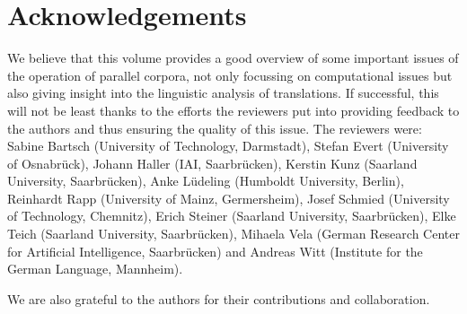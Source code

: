 \documentclass[output=paper]{LSP/langsci}
\begin{document}
\section{Acknowledgements} 

We believe that this volume provides a good overview of some important issues of the operation of parallel corpora, not only focussing on computational issues but also giving insight into the linguistic analysis of translations. If successful, this will not be least thanks to the efforts the reviewers put into providing feedback to the authors and thus ensuring the quality of this issue. The reviewers were: Sabine Bartsch (University of Technology, Darmstadt), Stefan Evert (University of Osnabrück), Johann Haller (IAI, Saarbrücken), Kerstin Kunz (Saarland University, Saarbrücken), Anke Lüdeling (Humboldt University, Berlin), Reinhardt Rapp (University of Mainz, Germersheim), Josef Schmied (University of Technology, Chemnitz), Erich Steiner (Saarland University, Saarbrücken), Elke Teich (Saarland University, Saarbrücken), Mihaela Vela (German Research Center for Artificial Intelligence, Saarbrücken) and Andreas Witt (Institute for the German Language, Mannheim).

We are also grateful to the authors for their contributions and collaboration. 

\printbibliography[heading=subbibliography,notkeyword=this] 
\end{document}
